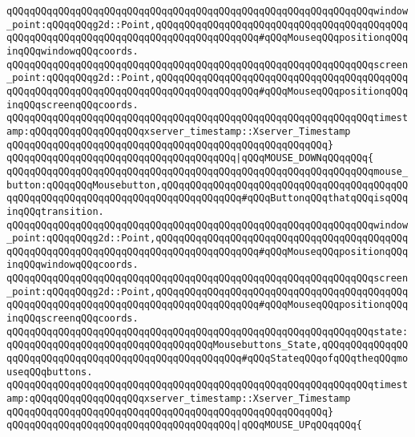 \verb|qQQqqQQqqQQqqQQqqQQqqQQqqQQqqQQqqQQqqQQqqQQqqQQqqQQqqQQqqQQqqQQqwindow_point:qQQqqQQqg2d::Point,qQQqqQQqqQQqqQQqqQQqqQQqqQQqqQQqqQQqqQQqqQQqqQQqqQQqqQQqqQQqqQQqqQQqqQQqqQQqqQQqqQQqqQQq#qQQqMouseqQQqpositionqQQqinqQQqwindowqQQqcoords.|\newline
\verb|qQQqqQQqqQQqqQQqqQQqqQQqqQQqqQQqqQQqqQQqqQQqqQQqqQQqqQQqqQQqqQQqscreen_point:qQQqqQQqg2d::Point,qQQqqQQqqQQqqQQqqQQqqQQqqQQqqQQqqQQqqQQqqQQqqQQqqQQqqQQqqQQqqQQqqQQqqQQqqQQqqQQqqQQqqQQq#qQQqMouseqQQqpositionqQQqinqQQqscreenqQQqcoords.|\newline
\verb|qQQqqQQqqQQqqQQqqQQqqQQqqQQqqQQqqQQqqQQqqQQqqQQqqQQqqQQqqQQqqQQqtimestamp:qQQqqQQqqQQqqQQqqQQqxserver_timestamp::Xserver_Timestamp|\newline
\verb|qQQqqQQqqQQqqQQqqQQqqQQqqQQqqQQqqQQqqQQqqQQqqQQqqQQqqQQq}|\newline
\newline
\verb|qQQqqQQqqQQqqQQqqQQqqQQqqQQqqQQqqQQqqQQq|\verb#|qQQqMOUSE_DOWNqQQqqQQq{#\newline
\verb|qQQqqQQqqQQqqQQqqQQqqQQqqQQqqQQqqQQqqQQqqQQqqQQqqQQqqQQqqQQqqQQqmouse_button:qQQqqQQqMousebutton,qQQqqQQqqQQqqQQqqQQqqQQqqQQqqQQqqQQqqQQqqQQqqQQqqQQqqQQqqQQqqQQqqQQqqQQqqQQqqQQqqQQq#qQQqButtonqQQqthatqQQqisqQQqinqQQqtransition.|\newline
\verb|qQQqqQQqqQQqqQQqqQQqqQQqqQQqqQQqqQQqqQQqqQQqqQQqqQQqqQQqqQQqqQQqwindow_point:qQQqqQQqg2d::Point,qQQqqQQqqQQqqQQqqQQqqQQqqQQqqQQqqQQqqQQqqQQqqQQqqQQqqQQqqQQqqQQqqQQqqQQqqQQqqQQqqQQqqQQq#qQQqMouseqQQqpositionqQQqinqQQqwindowqQQqcoords.|\newline
\verb|qQQqqQQqqQQqqQQqqQQqqQQqqQQqqQQqqQQqqQQqqQQqqQQqqQQqqQQqqQQqqQQqscreen_point:qQQqqQQqg2d::Point,qQQqqQQqqQQqqQQqqQQqqQQqqQQqqQQqqQQqqQQqqQQqqQQqqQQqqQQqqQQqqQQqqQQqqQQqqQQqqQQqqQQqqQQq#qQQqMouseqQQqpositionqQQqinqQQqscreenqQQqcoords.|\newline
\verb|qQQqqQQqqQQqqQQqqQQqqQQqqQQqqQQqqQQqqQQqqQQqqQQqqQQqqQQqqQQqqQQqstate:qQQqqQQqqQQqqQQqqQQqqQQqqQQqqQQqqQQqMousebuttons_State,qQQqqQQqqQQqqQQqqQQqqQQqqQQqqQQqqQQqqQQqqQQqqQQqqQQqqQQq#qQQqStateqQQqofqQQqtheqQQqmouseqQQqbuttons.|\newline
\verb|qQQqqQQqqQQqqQQqqQQqqQQqqQQqqQQqqQQqqQQqqQQqqQQqqQQqqQQqqQQqqQQqtimestamp:qQQqqQQqqQQqqQQqqQQqxserver_timestamp::Xserver_Timestamp|\newline
\verb|qQQqqQQqqQQqqQQqqQQqqQQqqQQqqQQqqQQqqQQqqQQqqQQqqQQqqQQq}|\newline
\newline
\verb|qQQqqQQqqQQqqQQqqQQqqQQqqQQqqQQqqQQqqQQq|\verb#|qQQqMOUSE_UPqQQqqQQq{#\newline
